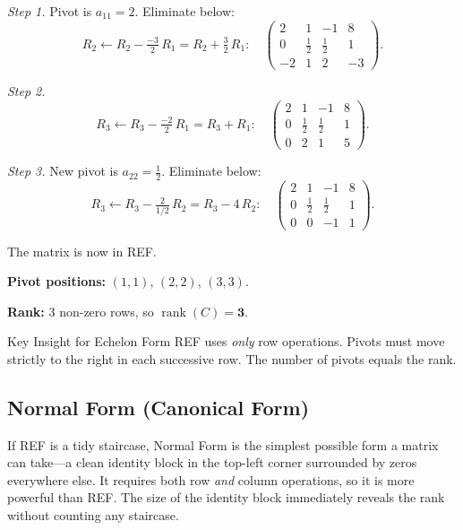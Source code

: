 \documentclass[12pt,a4paper]{article}
\begin{document}
\textit{Step 1.} Pivot is $a_{11}=2$. Eliminate below:
\[
R_2 \leftarrow R_2 - \tfrac{-3}{2}\,R_1 = R_2 + \tfrac{3}{2}\,R_1:
\quad
\begin{pmatrix} 2 & 1 & -1 & 8 \\ 0 & \tfrac{1}{2} & \tfrac{1}{2} & 1 \\ -2 & 1 & 2 & -3 \end{pmatrix}.
\]

\textit{Step 2.}
\[
R_3 \leftarrow R_3 - \tfrac{-2}{2}\,R_1 = R_3 + R_1:
\quad
\begin{pmatrix} 2 & 1 & -1 & 8 \\ 0 & \tfrac{1}{2} & \tfrac{1}{2} & 1 \\ 0 & 2 & 1 & 5 \end{pmatrix}.
\]

\textit{Step 3.} New pivot is $a_{22}=\tfrac{1}{2}$. Eliminate below:
\[
R_3 \leftarrow R_3 - \tfrac{2}{1/2}\,R_2 = R_3 - 4\,R_2:
\quad
\begin{pmatrix} 2 & 1 & -1 & 8 \\ 0 & \tfrac{1}{2} & \tfrac{1}{2} & 1 \\ 0 & 0 & -1 & 1 \end{pmatrix}.
\]

The matrix is now in REF.

\textbf{Pivot positions:} $(1,1)$, $(2,2)$, $(3,3)$.

\textbf{Rank:} 3 non-zero rows, so $\operatorname{rank}(C) = \mathbf{3}$.

\begin{learnbox}{Key Insight for Echelon Form}
REF uses \emph{only} row operations. Pivots must move strictly to the right in each successive row. The number of pivots equals the rank.
\end{learnbox}

\subsection{Normal Form (Canonical Form)}

If REF is a tidy staircase, Normal Form is the simplest possible form a matrix can take---a clean
identity block in the top-left corner surrounded by zeros everywhere else. It requires both row
\emph{and} column operations, so it is more powerful than REF. The size of the identity block
immediately reveals the rank without counting any staircase.
\end{document}
